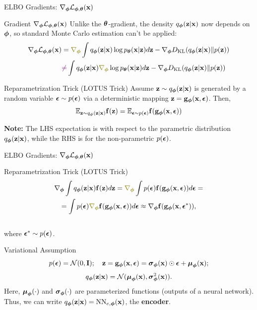 \documentclass{beamer}
\renewcommand{\eqpause}{}
\renewcommand{\nextonslide}[1]{#1}
\begin{document}
\begin{frame}{ELBO Gradients: $\nabla_{\boldsymbol{\phi}} \mathcal{L}_{\boldsymbol{\phi}, \boldsymbol{\theta}}(\mathbf{x})$}
	\begin{block}{Gradient $\nabla_{\boldsymbol{\phi}} \mathcal{L}_{\boldsymbol{\phi}, \boldsymbol{\theta}}(\mathbf{x})$}
		Unlike the $\boldsymbol{\theta}$-gradient, the density $q_{\boldsymbol{\phi}}(\mathbf{z}| \mathbf{x})$ now depends on $\boldsymbol{\phi}$, so standard Monte Carlo estimation can't be applied:
		\begin{align*}
			\nabla_{\bphi} \cL_{\bphi, \btheta}(\bx) &= {\color{olive}\nabla_{\bphi}} \int q_{\bphi}(\bz| \bx)\log \pt(\bx | \bz) d \bz - \nabla_{\bphi} \KL(q_{\bphi}(\bz| \bx) \| p(\bz)) \\
			\nextonslide{& {\color{violet}\neq} \int q_{\bphi}(\bz| \bx) {\color{olive}\nabla_{\bphi}} \log \pt(\bx | \bz) d \bz - \nabla_{\bphi} \KL(q_{\bphi}(\bz| \bx) \| p(\bz))}
		\end{align*}
	\end{block}
	\eqpause
	\vspace{-0.5cm}
	\begin{block}{Reparametrization Trick (LOTUS Trick)} 
		Assume $\mathbf{z} \sim q_{\boldsymbol{\phi}}(\mathbf{z}| \mathbf{x})$ is generated by a random variable $\boldsymbol{\epsilon} \sim p(\boldsymbol{\epsilon})$ via a deterministic mapping $\mathbf{z} = \mathbf{g}_{\boldsymbol{\phi}}(\mathbf{x}, \boldsymbol{\epsilon})$. Then,
		\[
			\mathbb{E}_{\mathbf{z} \sim q_{\boldsymbol{\phi}}(\mathbf{z}| \mathbf{x})} \mathbf{f}(\mathbf{z}) = \mathbb{E}_{\boldsymbol{\epsilon} \sim p(\boldsymbol{\epsilon})} \mathbf{f}(\mathbf{g}_{\boldsymbol{\phi}}(\mathbf{x}, \boldsymbol{\epsilon}))
		\]
		\eqpause
		\textbf{Note:} The LHS expectation is with respect to the parametric distribution $q_{\boldsymbol{\phi}}(\mathbf{z}| \mathbf{x})$, while the RHS is for the non-parametric $p(\boldsymbol{\epsilon})$.
	\end{block}
\end{frame}
\begin{frame}{ELBO Gradients: $\nabla_{\boldsymbol{\phi}} \mathcal{L}_{\boldsymbol{\phi}, \boldsymbol{\theta}}(\mathbf{x})$}
	\begin{block}{Reparametrization Trick (LOTUS Trick)} 
		\vspace{-0.7cm}
		\begin{multline*}
			\nabla_{\bphi}\int q_{\bphi}(\bz| \bx) \bff(\bz) d\bz = {\color{olive}\nabla_{\bphi}} \int p(\bepsilon)  \bff(\bg_{\bphi}(\bx, \bepsilon)) d\bepsilon 
			\nextonslide{= \\ = \int p(\bepsilon) {\color{olive}\nabla_{\bphi}} \bff(\bg_{\bphi}(\bx, \bepsilon)) d\bepsilon \approx \nabla_{\bphi} \bff(\bg_{\bphi}(\bx, \bepsilon^*))},
		\end{multline*}
		\vspace{-0.5cm} \\
		where $\boldsymbol{\epsilon}^* \sim p(\boldsymbol{\epsilon})$.
	\end{block}
	\eqpause
	\begin{block}{Variational Assumption} 
		\vspace{-0.3cm}
		\[
			p(\boldsymbol{\epsilon}) = \mathcal{N}(0, \mathbf{I}); \quad \mathbf{z} = \mathbf{g}_{\boldsymbol{\phi}}(\mathbf{x}, \boldsymbol{\epsilon}) = \boldsymbol{\sigma}_{\boldsymbol{\phi}}(\mathbf{x}) \odot \boldsymbol{\epsilon} + \boldsymbol{\mu}_{\boldsymbol{\phi}}(\mathbf{x});
		\]
		\[
			q_{\boldsymbol{\phi}}(\mathbf{z}| \mathbf{x}) = \mathcal{N} (\boldsymbol{\mu}_{\boldsymbol{\phi}}(\mathbf{x}), \boldsymbol{\sigma}^2_{\boldsymbol{\phi}}(\mathbf{x})).
		\]
		Here, $\boldsymbol{\mu}_{\boldsymbol{\phi}}(\cdot)$ and $\boldsymbol{\sigma}_{\boldsymbol{\phi}}(\cdot)$ are parameterized functions (outputs of a neural network). \\
		Thus, we can write $q_{\boldsymbol{\phi}}(\mathbf{z}| \mathbf{x}) = \mathrm{NN}_{e, \boldsymbol{\phi}}(\mathbf{x})$, the \textbf{encoder}.
	\end{block}
\end{frame}
\end{document}
